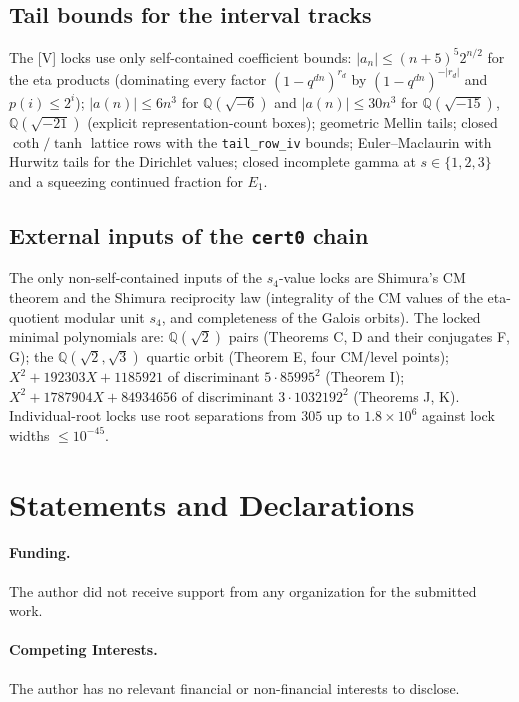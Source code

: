 \documentclass[11pt]{article}
\newcommand{\Qq}{\mathbb{Q}}
\theoremstyle{definition}
\theoremstyle{remark}
\begin{document}
\subsection{Tail bounds for the interval tracks}\label{app:tails}

The [V] locks use only self-contained coefficient bounds:
$|a_n|\le(n+5)^5 2^{n/2}$ for the eta products (dominating every
factor $(1-q^{dn})^{r_d}$ by $(1-q^{dn})^{-|r_d|}$ and
$p(i)\le2^i$); $|a(n)|\le6n^3$ for $\Qq(\sqrt{-6})$ and
$|a(n)|\le30n^3$ for $\Qq(\sqrt{-15})$, $\Qq(\sqrt{-21})$ (explicit
representation-count boxes); geometric Mellin tails; closed
$\coth/\tanh$ lattice rows with the \texttt{tail\_row\_iv} bounds;
Euler--Maclaurin with Hurwitz tails for the Dirichlet values; closed
incomplete gamma at $s\in\{1,2,3\}$ and a squeezing continued fraction
for $E_1$.

\subsection{External inputs of the \texttt{cert0} chain}\label{app:cert0}

The only non-self-contained inputs of the $s_4$-value locks are
Shimura's CM theorem and the Shimura reciprocity law (integrality of
the CM values of the eta-quotient modular unit $s_4$, and completeness
of the Galois orbits). The locked minimal polynomials are:
$\Qq(\sqrt2)$ pairs (Theorems C, D and their conjugates F, G); the
$\Qq(\sqrt2,\sqrt3)$ quartic orbit (Theorem E, four CM/level points);
$X^2+192303X+1185921$ of discriminant $5\cdot85995^2$ (Theorem I);
$X^2+1787904X+84934656$ of discriminant $3\cdot1032192^2$ (Theorems J,
K). Individual-root locks use root separations from $305$ up to
$1.8\times10^6$ against lock widths $\le10^{-45}$.

\section*{Statements and Declarations}
\paragraph{Funding.} The author did not receive support from any
organization for the submitted work.
\paragraph{Competing Interests.} The author has no relevant financial or
non-financial interests to disclose.
\end{document}

